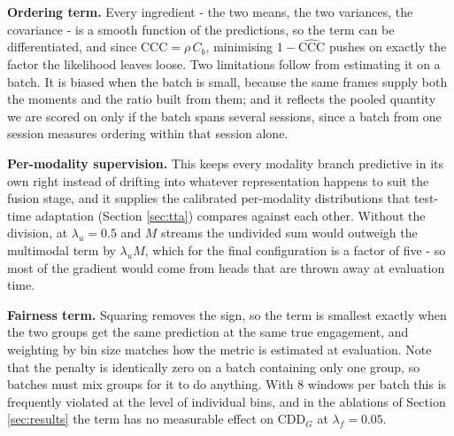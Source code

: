 \documentclass[10pt,a4paper,twocolumn]{article}
\begin{document}
	\textbf{Ordering term.} Every ingredient - the two means, the two variances, the covariance - is a smooth function of the predictions, so the term can be differentiated, and since $\text{CCC} = \rho\,C_b$, minimising $1-\widehat{\text{CCC}}$ pushes on exactly the factor the likelihood leaves loose. Two limitations follow from estimating it on a batch. It is biased when the batch is small, because the same frames supply both the moments and the ratio built from them; and it reflects the pooled quantity we are scored on only if the batch spans several sessions, since a batch from one session measures ordering within that session alone.

	\textbf{Per-modality supervision.} This keeps every modality branch predictive in its own right instead of drifting into whatever representation happens to suit the fusion stage, and it supplies the calibrated per-modality distributions that test-time adaptation (Section \ref{sec:tta}) compares against each other. Without the division, at $\lambda_u = 0.5$ and $M$ streams the undivided sum would outweigh the multimodal term by $\lambda_u M$, which for the final configuration is a factor of five - so most of the gradient would come from heads that are thrown away at evaluation time.

	\textbf{Fairness term.} Squaring removes the sign, so the term is smallest exactly when the two groups get the same prediction at the same true engagement, and weighting by bin size matches how the metric is estimated at evaluation. Note that the penalty is identically zero on a batch containing only one group, so batches must mix groups for it to do anything. With $8$ windows per batch this is frequently violated at the level of individual bins, and in the ablations of Section \ref{sec:results} the term has no measurable effect on $\text{CDD}_G$ at $\lambda_f = 0.05$.

	\label{app:evaluation}
\end{document}
